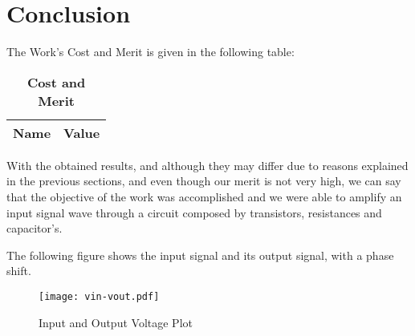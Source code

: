 \section{Conclusion}
\label{sec:conclusion}

The Work's Cost and Merit is given in the following table:

\begin{table}[H]
\centering
\begin{tabular}{|l|l|}
\hline
{\bf Name} & {\bf Value} \\ \hline
\end{tabular}
\caption{\textbf{Cost and Merit}}
\end{table}

With the obtained results, and although they may differ due to reasons explained in the previous sections, and even though our merit is not very high, we can say that the objective of the work was accomplished and we were able to amplify an input signal wave through a circuit composed by transistors, resistances and capacitor's.

The following figure shows the input signal and its output signal, with a phase shift.

\begin{figure}[h] 
\centering
\texttt{[image: vin-vout.pdf]}
\caption{Input and Output Voltage Plot}
\label{Fig5: In-Out Plot}
\end{figure}
